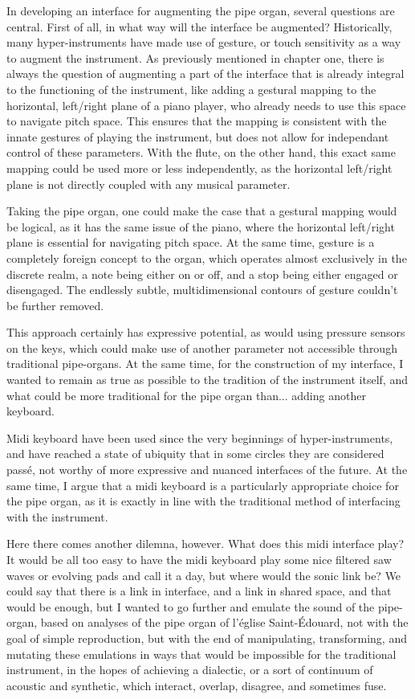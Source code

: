 \documentclass[12pt,twoside,maitrise]{dms}
\theoremstyle{definition}
\begin{document}
In developing an interface for augmenting the pipe organ, several questions are central.
First of all, in what way will the interface be augmented?
Historically, many hyper-instruments have made use of gesture, or touch sensitivity as a way to augment the instrument.
As previously mentioned in chapter one, there is always the question of augmenting a part of the interface that is already integral to the functioning of the instrument, like adding a gestural mapping to the horizontal, left/right plane of a piano player, who already needs to use this space to navigate pitch space.
This ensures that the mapping is consistent with the innate gestures of playing the instrument, but does not allow for independant control of these parameters.
With the flute, on the other hand, this exact same mapping could be used more or less independently, as the horizontal left/right plane is not directly coupled with any musical parameter.

Taking the pipe organ, one could make the case that a gestural mapping would be logical, as it has the same issue of the piano, where the horizontal left/right plane is essential for navigating pitch space.
At the same time, gesture is a completely foreign concept to the organ, which operates almost exclusively in the discrete realm, a note being either on or off, and a stop being either engaged or disengaged.
The endlessly subtle, multidimensional contours of gesture couldn't be further removed.

This approach certainly has expressive potential, as would using pressure sensors on the keys, which could make use of another parameter not accessible through traditional pipe-organs.
At the same time, for the construction of my interface, I wanted to remain as true as possible to the tradition of the instrument itself, and what could be more traditional for the pipe organ than... adding another keyboard.

Midi keyboard have been used since the very beginnings of hyper-instruments, and have reached a state of ubiquity that in some circles they are considered passé, not worthy of more expressive and nuanced interfaces of the future.
At the same time, I argue that a midi keyboard is a particularly appropriate choice for the pipe organ, as it is exactly in line with the traditional method of interfacing with the instrument.

Here there comes another dilemna, however.
What does this midi interface play?
It would be all too easy to have the midi keyboard play some nice filtered saw waves or evolving pads and call it a day, but where would the sonic link be?
We could say that there is a link in interface, and a link in shared space, and that would be enough, but I wanted to go further and emulate the sound of the pipe-organ, based on analyses of the pipe organ of l'église Saint-Édouard, not with the goal of simple reproduction, but with the end of manipulating, transforming, and mutating these emulations in ways that would be impossible for the traditional instrument, in the hopes of achieving a dialectic, or a sort of continuum of acoustic and synthetic, which interact, overlap, disagree, and sometimes fuse.
\end{document}
